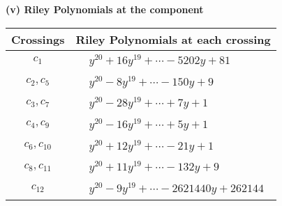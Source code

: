 \documentclass[1p]{elsarticle_modified}
\theoremstyle{definition}
\begin{document}
\flushleft \textbf{(v) Riley Polynomials at the component}\newline \\
\begin{tabular}{m{50pt}|m{274pt}}
Crossings & \hspace{64pt}Riley Polynomials at each crossing \\
\hline $$\begin{aligned}c_{1}\end{aligned}$$&$\begin{aligned}
&y^{20}+16 y^{19}+\cdots-5202 y+81
\end{aligned}$\\
\hline $$\begin{aligned}c_{2},c_{5}\end{aligned}$$&$\begin{aligned}
&y^{20}-8 y^{19}+\cdots-150 y+9
\end{aligned}$\\
\hline $$\begin{aligned}c_{3},c_{7}\end{aligned}$$&$\begin{aligned}
&y^{20}-28 y^{19}+\cdots+7 y+1
\end{aligned}$\\
\hline $$\begin{aligned}c_{4},c_{9}\end{aligned}$$&$\begin{aligned}
&y^{20}-16 y^{19}+\cdots+5 y+1
\end{aligned}$\\
\hline $$\begin{aligned}c_{6},c_{10}\end{aligned}$$&$\begin{aligned}
&y^{20}+12 y^{19}+\cdots-21 y+1
\end{aligned}$\\
\hline $$\begin{aligned}c_{8},c_{11}\end{aligned}$$&$\begin{aligned}
&y^{20}+11 y^{19}+\cdots-132 y+9
\end{aligned}$\\
\hline $$\begin{aligned}c_{12}\end{aligned}$$&$\begin{aligned}
&y^{20}-9 y^{19}+\cdots-2621440 y+262144
\end{aligned}$\\
\hline
\end{tabular}\\~\\
\end{document}
